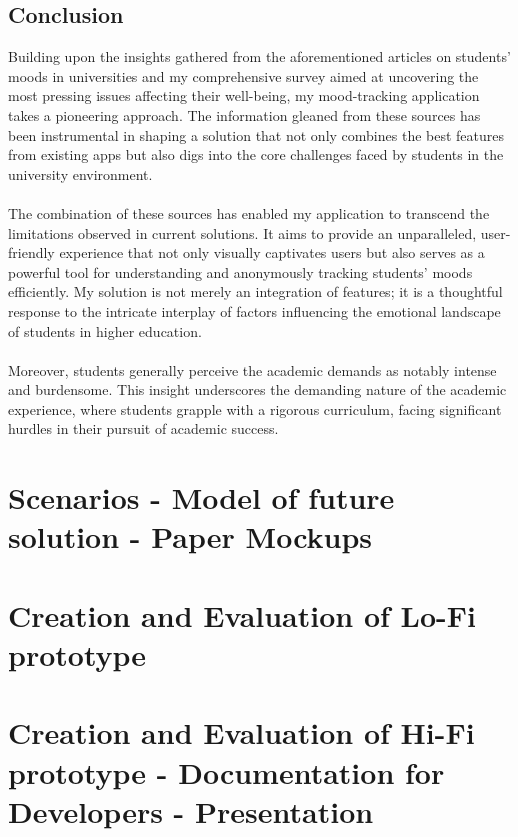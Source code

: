 \documentclass[11pt]{report}
\begin{document}
\section{Conclusion}

Building upon the insights gathered from the aforementioned articles on students' moods in universities and my comprehensive survey aimed at uncovering the most pressing issues affecting their well-being, my mood-tracking application takes a pioneering approach. The information gleaned from these sources has been instrumental in shaping a solution that not only combines the best features from existing apps but also digs into the core challenges faced by students in the university environment.\\ \\
The combination of these sources has enabled my application to transcend the limitations observed in current solutions. It aims to provide an unparalleled, user-friendly experience that not only visually captivates users but also serves as a powerful tool for understanding and anonymously tracking students' moods efficiently. My solution is not merely an integration of features; it is a thoughtful response to the intricate interplay of factors influencing the emotional landscape of students in higher education.\\ \\
Moreover, students generally perceive the academic demands as notably intense and burdensome. This insight underscores the demanding nature of the academic experience, where students grapple with a rigorous curriculum, facing significant hurdles in their pursuit of academic success.

\chapterfont{\LARGE \centering}
\chaptertitlefont{\Large \centering}
\chapter{Scenarios - Model of future solution - Paper Mockups}


\chapterfont{\LARGE \centering}
\chaptertitlefont{\Large \centering}
\chapter{Creation and Evaluation of  Lo-Fi prototype}


\chapterfont{\LARGE \centering}
\chaptertitlefont{\Large \centering}
\chapter{Creation and Evaluation of  Hi-Fi prototype - Documentation for Developers - Presentation}

\printbibliography
\end{document}
